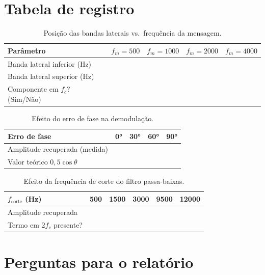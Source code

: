 \documentclass[11pt,a4paper]{article}
\begin{document}
\section{Tabela de registro}

\begin{table}[H]
  \centering
  \begin{tabular}{l c c c c}
    \toprule
    \textbf{Parâmetro} & \boldmath$f_m = 500$ & \boldmath$f_m = 1000$ &
      \boldmath$f_m = 2000$ & \boldmath$f_m = 4000$ \\
    \midrule
    Banda lateral inferior (Hz)     & & & & \\
    Banda lateral superior (Hz)     & & & & \\
    Componente em $f_c$? (Sim/Não)  & & & & \\
    \bottomrule
  \end{tabular}
  \caption{Posição das bandas laterais vs.\ frequência da mensagem.}
\end{table}

\begin{table}[H]
  \centering
  \begin{tabular}{l c c c c}
    \toprule
    \textbf{Erro de fase} & 0° & 30° & 60° & 90° \\
    \midrule
    Amplitude recuperada (medida)   &  &  &  &  \\
    Valor teórico $0{,}5\cos\theta$ &  &  &  &  \\
    \bottomrule
  \end{tabular}
  \caption{Efeito do erro de fase na demodulação.}
\end{table}

\begin{table}[H]
  \centering
  \begin{tabular}{l c c c c c}
    \toprule
    \boldmath$f_\text{corte}$ (Hz) & 500 & 1500 & 3000 & 9500 & 12000 \\
    \midrule
    Amplitude recuperada          & & & & & \\
    Termo em $2f_c$ presente?     & & & & & \\
    \bottomrule
  \end{tabular}
  \caption{Efeito da frequência de corte do filtro passa-baixas.}
\end{table}

\section{Perguntas para o relatório}
\end{document}
